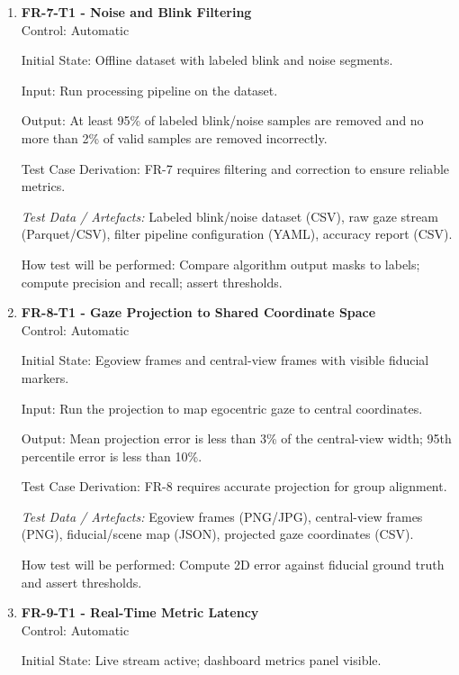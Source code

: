 \documentclass[12pt, titlepage]{article}
\begin{document}
\begin{enumerate}

\item \textbf{FR-7-T1 - Noise and Blink Filtering} \\

Control: Automatic

Initial State: Offline dataset with labeled blink and noise segments.

Input: Run processing pipeline on the dataset.

Output: At least 95\% of labeled blink/noise samples are removed and no more than 2\% of valid samples are removed incorrectly.

Test Case Derivation: FR-7 requires filtering and correction to ensure reliable metrics.

\textit{Test Data / Artefacts:} Labeled blink/noise dataset (CSV), raw gaze stream (Parquet/CSV), filter pipeline configuration (YAML), accuracy report (CSV).

How test will be performed: Compare algorithm output masks to labels; compute precision and recall; assert thresholds.

\item \textbf{FR-8-T1 - Gaze Projection to Shared Coordinate Space} \\

Control: Automatic

Initial State: Egoview frames and central-view frames with visible fiducial markers.

Input: Run the projection to map egocentric gaze to central coordinates.

Output: Mean projection error is less than 3\% of the central-view width; 95th percentile error is less than 10\%.

Test Case Derivation: FR-8 requires accurate projection for group alignment.

\textit{Test Data / Artefacts:} Egoview frames (PNG/JPG), central-view frames (PNG), fiducial/scene map (JSON), projected gaze coordinates (CSV).

How test will be performed: Compute 2D error against fiducial ground truth and assert thresholds.

\item \textbf{FR-9-T1 - Real-Time Metric Latency} \\

Control: Automatic

Initial State: Live stream active; dashboard metrics panel visible.


\end{enumerate}
\end{document}
